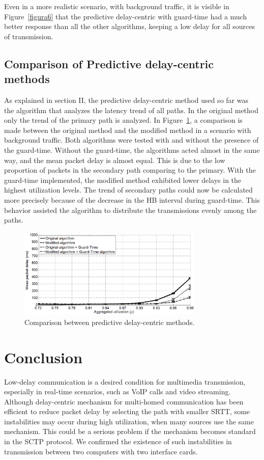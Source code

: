 \documentclass[letterpaper,10pt,oneside,conference,final]{sbrt2015}
\begin{document}
Even in a more realistic scenario, with background traffic, it is visible in Figure~\ref{figura6} that the predictive delay-centric with guard-time had a much better response than all the other algorithms, keeping a low delay for all sources of transmission.

\subsection{Comparison of Predictive delay-centric methods}
As explained in section II, the predictive delay-centric method used so far was the algorithm that analyzes the latency trend of all paths. In the original method only the trend of the primary path is analyzed. In Figure~\ref{figura7}, a comparison is made between the original method and the modified method in a scenario with background traffic. Both algorithms were tested with and without the presence of the guard-time.
Without the guard-time, the algorithms acted almost in the same way, and the mean packet delay is almost equal. This is due to the low proportion of packets in the secondary path comparing to the primary. With the guard-time implemented, the modified method exhibited lower delays in the highest utilization levels. The trend of secondary paths could now be calculated more precisely because of the decrease in the HB interval during guard-time. This behavior assisted the algorithm to distribute the transmissions evenly among the paths.

\begin{figure}[h!]
	\centering
	\includegraphics[width=8.8cm,height=4.3cm]{figura7}
	\caption{Comparison between predictive delay-centric methods.}
	\label{figura7}
\end{figure}

\section{Conclusion}

Low-delay communication is a desired condition for multimedia transmission, especially in real-time scenarios, such as VoIP calls and video streaming. Although delay-centric mechanism for multi-homed communication has been efficient to reduce packet delay by selecting the path with smaller SRTT, some instabilities may occur during high utilization, when many sources use the same mechanism. This could be a serious problem if the mechanism becomes standard in the SCTP protocol. We confirmed the existence of such instabilities in transmission between two computers with two interface cards.
\end{document}
